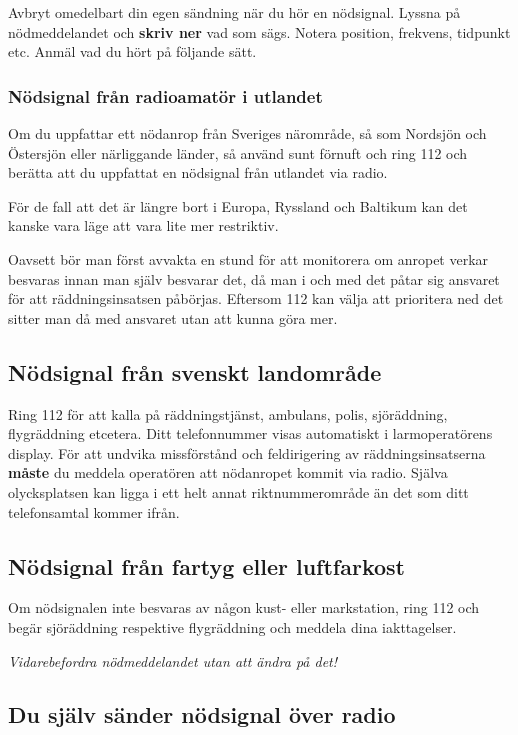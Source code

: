 Avbryt omedelbart din egen sändning när du hör en nödsignal. Lyssna på
nödmeddelandet och \textbf{skriv ner} vad som sägs.
Notera position, frekvens, tidpunkt etc. Anmäl vad du hört på följande sätt.

\subsubsection{Nödsignal från radioamatör i utlandet}

Om du uppfattar ett nödanrop från Sveriges närområde, så som Nordsjön och
Östersjön eller närliggande länder, så använd sunt förnuft och ring 112 och
berätta att du uppfattat en nödsignal från utlandet via radio.

För de fall att det är längre bort i Europa, Ryssland och Baltikum kan det
kanske vara läge att vara lite mer restriktiv.

Oavsett bör man först avvakta en stund för att monitorera om anropet verkar
besvaras innan man själv besvarar det, då man i och med det påtar sig ansvaret
för att räddningsinsatsen påbörjas.
Eftersom 112 kan välja att prioritera ned det sitter man då med ansvaret utan
att kunna göra mer.

\subsection{Nödsignal från svenskt landområde}

Ring 112 för att kalla på räddningstjänst, ambulans, polis, sjöräddning,
flygräddning etcetera.
Ditt telefonnummer visas automatiskt i larmoperatörens display.
För att undvika missförstånd och feldirigering av räddningsinsatserna
\textbf{måste} du meddela operatören att nödanropet kommit via radio.
Själva olycksplatsen kan ligga i ett helt annat riktnummerområde än det som ditt
telefonsamtal kommer ifrån.

\subsection{Nödsignal från fartyg eller luftfarkost}

Om nödsignalen inte besvaras av någon kust- eller markstation, ring 112
och begär sjöräddning respektive flygräddning och meddela dina iakttagelser.

\emph{Vidarebefordra nödmeddelandet utan att ändra på det!}

\subsection{Du själv sänder nödsignal över radio}


